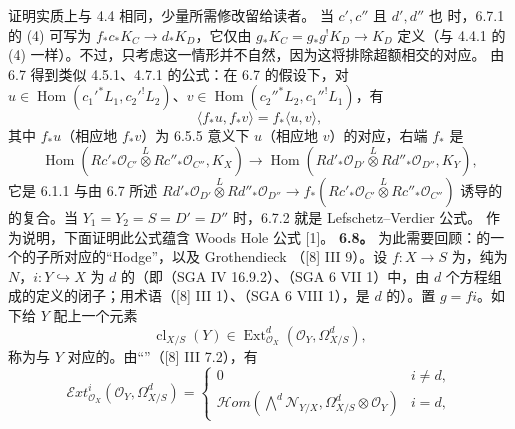 证明实质上与 4.4 相同，少量所需修改留给读者。
当 $c',c''$ 且 $d',d''$ 也 时，6.7.1 的 (4) 可写为 $f_*c_*K_C\to d_*K_D$，它仅由 $g_*K_C=g_*g^!K_D\to K_D$ 定义（与 4.4.1 的 (4) 一样）。不过，只考虑这一情形并不自然，因为这将排除超额相交的对应。
由 6.7 得到类似 4.5.1、4.7.1 的公式：在 6.7 的假设下，对 $u\in\operatorname{Hom}(c_1'^*L_1,c_2'^!L_2)$、$v\in\operatorname{Hom}(c_2''^*L_2,c_1''^!L_1)$，有
\[\langle f_*u,f_*v\rangle=f_*\langle u,v\rangle,\tag{6.7.2}\]
其中 $f_*u$（相应地 $f_*v$）为 6.5.5 意义下 $u$（相应地 $v$）的对应，右端 $f_*$ 是
\[\operatorname{Hom}(Rc'_*\mathcal O_{C'}\mathbin{\overset L\otimes}Rc''_*\mathcal O_{C''},K_X)\longrightarrow\operatorname{Hom}(Rd'_*\mathcal O_{D'}\mathbin{\overset L\otimes}Rd''_*\mathcal O_{D''},K_Y),\tag{6.7.3}\]
它是 6.1.1 与由 6.7 所述 $Rd'_*\mathcal O_{D'}\mathbin{\overset L\otimes}Rd''_*\mathcal O_{D''}\to f_*(Rc'_*\mathcal O_{C'}\mathbin{\overset L\otimes}Rc''_*\mathcal O_{C''})$ 诱导的的复合。当 $Y_1=Y_2=S=D'=D''$ 时，6.7.2 就是 Lefschetz--Verdier 公式。
作为说明，下面证明此公式蕴含 Woods Hole 公式 [1]。
\textbf{6.8。} 为此需要回顾：的一个的子所对应的“Hodge”，以及 Grothendieck （[8] III 9）。设 $f:X\to S$ 为，纯为 $N$，$i:Y\hookrightarrow X$ 为 $d$ 的（即（SGA IV 16.9.2）、（SGA 6 VII 1）中，由 $d$ 个方程组成的定义的闭子；用术语（[8] III 1）、（SGA 6 VIII 1），是 $d$ 的）。置 $g=fi$。如下给 $Y$ 配上一个元素
\[\operatorname{cl}_{X/S}(Y)\in\operatorname{Ext}_{\mathcal O_X}^d(\mathcal O_Y,\Omega^d_{X/S}),\tag{6.8.1}\]
称为与 $Y$ 对应的。由“”（[8] III 7.2），有
\[\mathcal Ext_{\mathcal O_X}^i(\mathcal O_Y,\Omega^d_{X/S})=
\begin{cases}0&i\ne d,\\\mathcal Hom(\bigwedge^d\mathcal N_{Y/X},\Omega^d_{X/S}\otimes\mathcal O_Y)&i=d,\end{cases}\tag{6.8.2}\]
